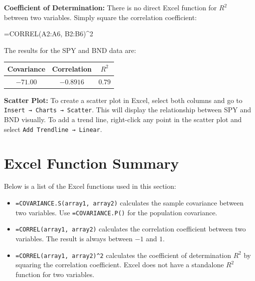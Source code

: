 \documentclass[
  11pt,
  letterpaper,
  DIV=11,
  numbers=noendperiod,
  oneside,
  open=any]{scrreprt}
\newenvironment{Shaded}{\begin{snugshade}}{\end{snugshade}}
\newcommand{\NormalTok}[1]{\textcolor[rgb]{0.00,0.23,0.31}{#1}}
\begin{document}
\textbf{Coefficient of Determination:} There is no direct Excel function
for \(R^2\) between two variables. Simply square the correlation
coefficient:

\begin{Shaded}
\begin{Highlighting}[]
\NormalTok{=CORREL(A2:A6, B2:B6)\^{}2}
\end{Highlighting}
\end{Shaded}

The results for the SPY and BND data are:

\begin{center}
\begin{tabular}{ccc}
\toprule
Covariance & Correlation & \(R^2\) \\
\midrule
\(-71.00\) & \(-0.8916\) & \(0.79\) \\
\bottomrule
\end{tabular}
\end{center}

\textbf{Scatter Plot:} To create a scatter plot in Excel, select both
columns and go to \texttt{Insert\ →\ Charts\ →\ Scatter}. This will
display the relationship between SPY and BND visually. To add a trend
line, right-click any point in the scatter plot and select
\texttt{Add\ Trendline\ →\ Linear}.

\section{Excel Function Summary}\label{excel-function-summary-3}

Below is a list of the Excel functions used in this section:

\begin{itemize}
\item
  \texttt{=COVARIANCE.S(array1,\ array2)} calculates the sample
  covariance between two variables. Use \texttt{=COVARIANCE.P()} for the
  population covariance.
\item
  \texttt{=CORREL(array1,\ array2)} calculates the correlation
  coefficient between two variables. The result is always between \(-1\)
  and \(1\).
\item
  \texttt{=CORREL(array1,\ array2)\^{}2} calculates the coefficient of
  determination \(R^2\) by squaring the correlation coefficient. Excel
  does not have a standalone \(R^2\) function for two variables.
\end{itemize}

\Needspace{7.4in}
\end{document}
